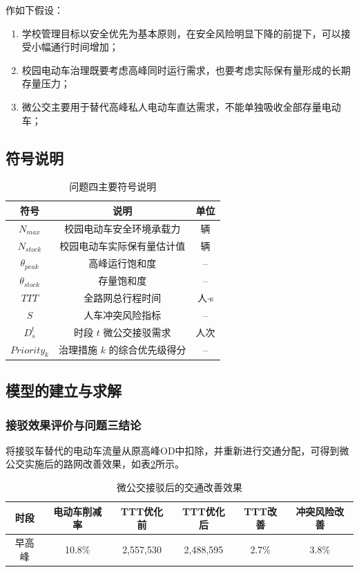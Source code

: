 \documentclass[UTF8,zihao=-4,a4paper]{ctexart}
\numberwithin{table}{section}
\numberwithin{figure}{section}
\numberwithin{equation}{section}
\begin{document}
作如下假设：
\begin{enumerate}
    \item 学校管理目标以安全优先为基本原则，在安全风险明显下降的前提下，可以接受小幅通行时间增加；
    \item 校园电动车治理既要考虑高峰同时运行需求，也要考虑实际保有量形成的长期存量压力；
    \item 微公交主要用于替代高峰私人电动车直达需求，不能单独吸收全部存量电动车；
\end{enumerate}

\subsection{符号说明}

\begin{table}[H]
\footnotesize
\centering
\caption{问题四主要符号说明}
\label{tab:symbols_q4}
\begin{tabular}{ccc}
\toprule
\textbf{符号} & \textbf{说明} & \textbf{单位} \\
\midrule
$N_{max}$ & 校园电动车安全环境承载力 & 辆 \\
$N_{stock}$ & 校园电动车实际保有量估计值 & 辆 \\
$\theta_{peak}$ & 高峰运行饱和度 & -- \\
$\theta_{stock}$ & 存量饱和度 & -- \\
$TTT$ & 全路网总行程时间 & 人$\cdot$s \\
$S$ & 人车冲突风险指标 & -- \\
$D_s^t$ & 时段 $t$ 微公交接驳需求 & 人次 \\
$Priority_k$ & 治理措施 $k$ 的综合优先级得分 & -- \\
\bottomrule
\end{tabular}
\end{table}

\subsection{模型的建立与求解}

\subsubsection{接驳效果评价与问题三结论}

将接驳车替代的电动车流量从原高峰OD中扣除，并重新进行交通分配，可得到微公交实施后的路网改善效果，如表\ref{tab:effect_result}所示。

\begin{table}[H]
\footnotesize
\centering
\caption{微公交接驳后的交通改善效果}
\label{tab:effect_result}
\begin{tabular}{cccccc}
\toprule
\textbf{时段} & \textbf{电动车削减率} & \textbf{TTT优化前} & \textbf{TTT优化后} & \textbf{TTT改善} & \textbf{冲突风险改善} \\
\midrule
早高峰 & 10.8\% & 2,557,530 & 2,488,595 & 2.7\% & 3.8\% \\
\bottomrule
\end{tabular}
\end{table}
\end{document}
